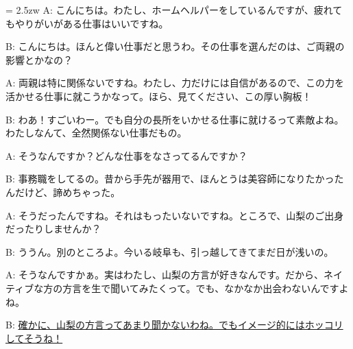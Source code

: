 \documentclass[11pt]{amsart}
\title{}
\author{}
\newenvironment{hangall}[1]{\hangindent = 2.5zw\everypar{\hangindent = 2.5zw}}{}
\begin{document}
\maketitle
\begin{hangall}{}%
A: こんにちは。わたし、ホームヘルパーをしているんですが、疲れてもやりがいがある仕事はいいですね。

B: こんにちは。ほんと偉い仕事だと思うわ。その仕事を選んだのは、ご両親の影響とかなの？

A: 両親は特に関係ないですね。わたし、力だけには自信があるので、この力を活かせる仕事に就こうかなって。ほら、見てください、この厚い胸板！

B: わあ！すごいわー。でも自分の長所をいかせる仕事に就けるって素敵よね。わたしなんて、全然関係ない仕事だもの。

A: そうなんですか？どんな仕事をなさってるんですか？

B: 事務職をしてるの。昔から手先が器用で、ほんとうは美容師になりたかったんだけど、諦めちゃった。

A: そうだったんですね。それはもったいないですね。ところで、山梨のご出身だったりしませんか？

B: ううん。別のところよ。今いる岐阜も、引っ越してきてまだ日が浅いの。

A: そうなんですかぁ。実はわたし、山梨の方言が好きなんです。だから、ネイティブな方の方言を生で聞いてみたくって。でも、なかなか出会わないんですよね。

B: \ul{確かに、山梨の方言ってあまり聞かないわね。でもイメージ的にはホッコリしてそうね！}\end{hangall}
\end{document}
